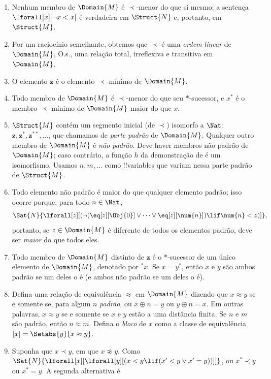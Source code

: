 \documentclass[../../../include/open-logic-section]{subfiles}
\begin{document}
\begin{enumerate}
\item Nenhum membro de $\Domain{M}$ é $\prec$-menor do que si mesmo: a sentença
  $\lforall[x][\lnot x < x]$ é verdadeira em $\Struct{N}$ e, portanto, em
  $\Struct{M}$.
\item Por um raciocínio semelhante, obtemos que $\prec$ é uma \emph{ordem
    linear} de $\Domain{M}$, O.s.\@, uma relação total, irreflexiva e transitiva
  em $\Domain{M}$. 
\item O elemento $\mathbf{z}$ é o elemento $\prec$-mínimo de $\Domain{M}$.
\item Todo membro de $\Domain{M}$ é $\prec$-menor do que seu $*$-sucessor, e
  $x^*$ é o membro $\prec$-mínimo de $\Domain{M}$ maior do que $x$.
\item $\Struct{M}$ contém um segmento inicial (de $\prec$) isomorfo
  a $\Nat$: $\mathbf{z}, \mathbf{z}^*, \mathbf{z}^{**}, \dots$, que
  chamamos de \emph{parte padrão} de $\Domain{M}$. Qualquer outro membro
  de $\Domain{M}$ é \emph{não padrão}. Deve haver membros não padrão
  de $\Domain{M}$; caso contrário, a função $h$ da demonstração de
   é um isomorfismo. Usamos $n, m, \dots$ como
  !!{variable}s que variam nessa parte padrão de $\Struct{M}$.
\item Todo elemento não padrão é maior do que qualquer elemento padrão;
  isso ocorre porque, para todo $n \in \Nat$,
  \[
  \Sat{N}{\lforall[z][(\lnot(\eq[z][\Obj{0}] \lor
  \dots \lor \eq[z][\num{n}]) \lif \num{n} < z)]},
  \]
  portanto, se $z \in \Domain{M}$ é diferente de todos os elementos
  padrão, deve ser \emph{maior} do que todos eles.
\item Todo membro de $\Domain{M}$ distinto de $\mathbf{z}$ é o
  $*$-sucessor de um único elemento de $\Domain{M}$, denotado por
  $^*x$. Se $x = y^*$, então $x$ e $y$ são ambos padrão se um deles
  o é (e ambos não padrão se um deles o é).
\item Defina uma relação de equivalência $\approx$ em $\Domain{M}$ dizendo
  que $x \approx y$ se e somente se, para algum $n$ \emph{padrão},
  ou $x \oplus n = y$ ou $y \oplus n =x$. Em outras palavras, $x
  \approx y$ se e somente se $x$ e $y$ estão a uma distância
  finita. Se $n$ e $m$ são padrão, então $n \approx m$. Defina o
  \emph{bloco} de $x$ como a classe de equivalência $[x] = \Setabs{y}{x
  \approx y}$.
\item Suponha que $x \prec y$, em que $x \not\approx y$. Como
  $\Sat{N}{\lforall[x][\lforall[y][(x < y \lif (x' < y \lor x' =
      y))]]}$, ou $x^* \prec y$ ou $x^* = y$. A segunda alternativa é

\end{enumerate}
\end{document}
